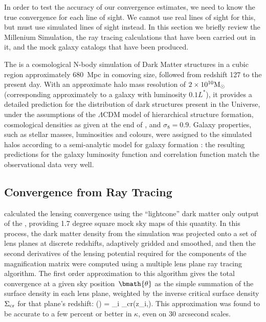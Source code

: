 \documentclass[useAMS,usenatbib]{mn2e}
\begin{document}
In order to test the accuracy of our convergence estimates, we need to
know the true convergence for each line of sight. We cannot use  real
lines of sight for this,  but must use simulated lines of sight instead.
In this section we briefly review the Millenium Simulation, the ray
tracing calculations that have been carried out in it, and the mock
galaxy catalogs that have been produced.

The \MS \citep{SpringelEtal2005} is a cosmological N-body simulation of
Dark Matter structures in a cubic region approximately 680~Mpc in
comoving size, followed from redshift 127 to the present day. With an
approximate halo mass resolution of $2\times10^{10}{\rm M}_{\odot}$
(corresponding approximately to a galaxy with luminosity $0.1L^{*}$), it
provides a detailed prediction for the distribution of dark structures
present in the Universe, under the assumptions of the $\Lambda$CDM model
of hierarchical structure formation, cosmological densities as given at
the end of , and $\sigma_8 = 0.9$. 
Galaxy properties,
such as stellar masses, luminosities and colours, were assigned to the
simulated halos according to a semi-analytic model for galaxy formation
\citep{DeLucia+Blaizot2007}: the resulting predictions for the galaxy
luminosity function and correlation function match the observational
data very well.


\subsection{Convergence from Ray Tracing}
\label{sec:MS:raytracing}

\citet{HilbertEtal2009} calculated the lensing convergence using the
``lightcone'' dark matter only 
output of the \MS, providing 1.7 degree square 
mock sky maps of this
quantity. In this process, the dark matter density from the simulation
was projected onto a set of lens planes at discrete redshifts,
adaptively gridded and smoothed, and then the second derivatives of the 
lensing potential required for the components of the magnification
matrix were computed using a multiple lens plane ray tracing algorithm.
The first order approximation to this algorithm \citep[equation 17
of][]{HilbertEtal2009} gives the total convergence at a given sky
position~$\bmath{\theta}$ as the simple summation of the surface density
in each lens plane, weighted by the inverse critical surface density
$\Sigma_{\rm cr}$ for that plane's redshift:
\be
\kappa(\bmath{\theta}) = \sum_i 
                                     {\Sigma_{\rm cr}(z_i,\zs)}.
\ee
This approximation was found to be accurate to a few percent or better
in $\kappa$, even on 30 arcsecond scales.
\end{document}
